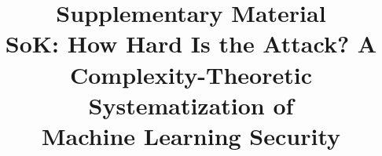 \documentclass[conference,compsoc]{IEEEtran}
\begin{document}
\title{Supplementary Material\\
SoK: How Hard Is the Attack? A Complexity-Theoretic Systematization of\\
Machine Learning Security}
\author{
}
\maketitle
\nocite{*}

\onecolumn


\twocolumn


\end{document}
